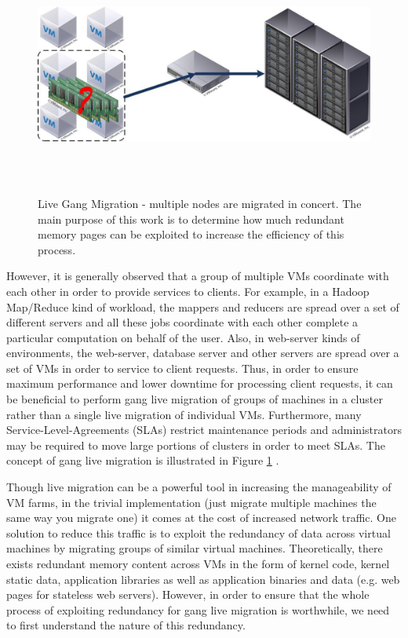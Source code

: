 \documentclass{acm_proc_article-sp}
\begin{document}
\par
\begin{figure}[ht]
\centering
        \includegraphics[height=8cm,width=18cm]{images/gang_migration.jpg}
    \caption{Live Gang Migration - multiple nodes are migrated in concert. The main purpose of this work is to determine how much redundant memory pages can be exploited to increase the efficiency of this process.}
    \label{fig:gang_migration}
\end{figure}
However, it is generally observed that a group of multiple VMs coordinate with each other in order to provide services to clients.  For example, in a Hadoop Map/Reduce kind of workload, the mappers and reducers are spread over a set of different servers and all these jobs coordinate with each other complete a particular computation on behalf of the user. Also, in web-server kinds of environments, the web-server, database server and other servers are spread over a set of VMs in order to service to client requests.  Thus, in order to ensure maximum performance and lower downtime for processing client requests, it can be beneficial to perform gang live migration of groups of machines in a cluster rather than a single live migration of individual VMs. Furthermore, many Service-Level-Agreements (SLAs) restrict maintenance periods and administrators may be required to move large portions of clusters in order to meet SLAs.  The concept of gang live migration is illustrated in Figure \ref{fig:gang_migration} \cite{live_gang}.


Though live migration can be a powerful tool in increasing the manageability of VM farms, in the trivial implementation (just migrate multiple machines the same way you migrate one) it comes at the cost of increased network traffic.  One solution to reduce this traffic is to exploit the redundancy of data across virtual machines by migrating groups of similar virtual machines.  Theoretically, there exists redundant memory content across VMs in the form of kernel code, kernel static data, application libraries as well as application binaries and data (e.g. web pages for stateless web servers).  However, in order to ensure that the whole process of exploiting redundancy for gang live migration is worthwhile, we need to first understand the nature of this redundancy.
\end{document}
